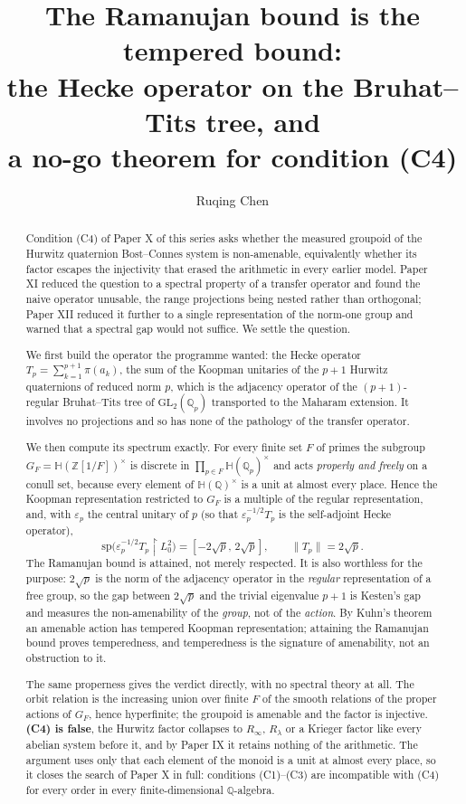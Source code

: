 \documentclass[11pt]{amsart}
\title[The Ramanujan bound is the tempered bound]{The Ramanujan bound is the tempered bound:\\
the Hecke operator on the Bruhat--Tits tree, and\\ a no-go theorem for condition (C4)}
\author{Ruqing Chen}
\date{}
\numberwithin{equation}{section}
\theoremstyle{definition}
\theoremstyle{remark}
\newcommand{\Z}{\mathbb{Z}}
\newcommand{\Q}{\mathbb{Q}}
\newcommand{\HH}{\mathbb{H}}
\begin{document}
\begin{abstract}
Condition (C4) of Paper X of this series asks whether the measured groupoid of the Hurwitz
quaternion Bost--Connes system is non-amenable, equivalently whether its factor escapes the
injectivity that erased the arithmetic in every earlier model. Paper XI reduced the question to a
spectral property of a transfer operator and found the naive operator unusable, the range
projections being nested rather than orthogonal; Paper XII reduced it further to a single
representation of the norm-one group and warned that a spectral gap would not suffice. We settle
the question.

We first build the operator the programme wanted: the Hecke operator
$T_p=\sum_{k=1}^{p+1}\pi(a_k)$, the sum of the Koopman unitaries of the $p+1$ Hurwitz quaternions
of reduced norm $p$, which is the adjacency operator of the $(p+1)$-regular Bruhat--Tits tree of
$\mathrm{GL}_2(\Q_p)$ transported to the Maharam extension. It involves no projections and so has
none of the pathology of the transfer operator.

We then compute its spectrum exactly. For every finite set $F$ of primes the subgroup
$G_F=\HH(\Z[1/F])^\times$ is discrete in $\prod_{p\in F}\HH(\Q_p)^\times$ and acts \emph{properly
and freely} on a conull set, because every element of $\HH(\Q)^\times$ is a unit at almost every
place. Hence the Koopman representation restricted to $G_F$ is a multiple of the regular
representation, and, with $\varepsilon_p$ the central unitary of $p$ (so that
$\varepsilon_p^{-1/2}T_p$ is the self-adjoint Hecke operator),
\[
\mathrm{sp}\bigl(\varepsilon_p^{-1/2}T_p\restriction L^2_0\bigr)=[-2\sqrt p,\,2\sqrt p],\qquad \|T_p\|=2\sqrt p .
\]
The Ramanujan bound is attained, not merely respected. It is also worthless for the purpose:
$2\sqrt p$ is the norm of the adjacency operator in the \emph{regular} representation of a free
group, so the gap between $2\sqrt p$ and the trivial eigenvalue $p+1$ is Kesten's gap and measures
the non-amenability of the \emph{group}, not of the \emph{action}. By Kuhn's theorem an amenable
action has tempered Koopman representation; attaining the Ramanujan bound proves temperedness, and
temperedness is the signature of amenability, not an obstruction to it.

The same properness gives the verdict directly, with no spectral theory at all. The orbit relation
is the increasing union over finite $F$ of the smooth relations of the proper actions of $G_F$,
hence hyperfinite; the groupoid is amenable and the factor is injective. \textbf{(C4) is false},
the Hurwitz factor collapses to $R_\infty$, $R_\lambda$ or a Krieger factor like every abelian
system before it, and by Paper IX it retains nothing of the arithmetic. The argument uses only
that each element of the monoid is a unit at almost every place, so it closes the search of
Paper X in full: conditions (C1)--(C3) are incompatible with (C4) for every order in every
finite-dimensional $\Q$-algebra.
\end{abstract}
\end{document}
